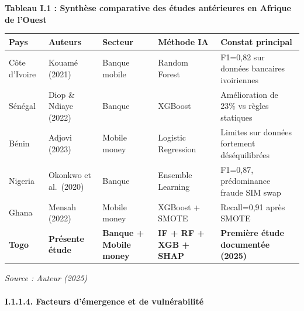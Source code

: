 \documentclass[
  12pt,
]{article}
\newcounter{none} %
\begin{document}
\textbf{Tableau I.1 : Synthèse comparative des études antérieures en
Afrique de l’Ouest}

{\def\LTcaptype{none} %
\begin{longtable}[]{@{}
  >{\raggedright\arraybackslash}p{}
  >{\raggedright\arraybackslash}p{}
  >{\raggedright\arraybackslash}p{}
  >{\raggedright\arraybackslash}p{}
  >{\raggedright\arraybackslash}p{}@{}}
\toprule\noalign{}
\begin{minipage}[b]{\linewidth}\raggedright
Pays
\end{minipage} & \begin{minipage}[b]{\linewidth}\raggedright
Auteurs
\end{minipage} & \begin{minipage}[b]{\linewidth}\raggedright
Secteur
\end{minipage} & \begin{minipage}[b]{\linewidth}\raggedright
Méthode IA
\end{minipage} & \begin{minipage}[b]{\linewidth}\raggedright
Constat principal
\end{minipage} \\
\midrule\noalign{}
\endhead
\bottomrule\noalign{}
\endlastfoot
Côte d’Ivoire & Kouamé (2021) & Banque mobile & Random Forest & F1=0,82
sur données bancaires ivoiriennes \\
Sénégal & Diop \& Ndiaye (2022) & Banque & XGBoost & Amélioration de
23\% vs règles statiques \\
Bénin & Adjovi (2023) & Mobile money & Logistic Regression & Limites sur
données fortement déséquilibrées \\
Nigeria & Okonkwo et al.~(2020) & Banque & Ensemble Learning & F1=0,87,
prédominance fraude SIM swap \\
Ghana & Mensah (2022) & Mobile money & XGBoost + SMOTE & Recall=0,91
après SMOTE \\
\textbf{Togo} & \textbf{Présente étude} & \textbf{Banque + Mobile money}
& \textbf{IF + RF + XGB + SHAP} & \textbf{Première étude documentée
(2025)} \\
\end{longtable}
}

\emph{Source : Auteur (2025)}

\paragraph{I.1.1.4. Facteurs d’émergence et de
vulnérabilité}\label{i.1.1.4.-facteurs-duxe9mergence-et-de-vulnuxe9rabilituxe9}
\end{document}
